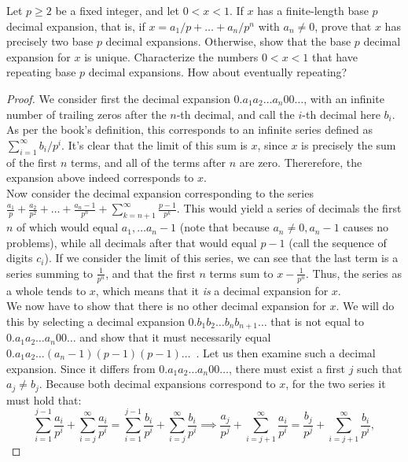 \begin{exercise}{21}
Let $p\geq 2$ be a fixed integer, and let $0<x<1$. If $x$ has a finite-length base $p$ decimal expansion, that is, if $x=a_1/p+\dots+a_n/p^n$ with $a_n\neq 0$, prove that $x$ has precisely two base $p$ decimal expansions. Otherwise, show that the base $p$ decimal expansion for $x$ is unique. Characterize the numbers $0<x<1$ that have repeating base $p$ decimal expansions. How about eventually repeating?
\end{exercise}
\begin{proof}
    We consider first the decimal expansion $0.a_1 a_2 \ldots a_n 0 0 \ldots$, with an infinite number of trailing zeros after the $n$-th decimal, and call the $i$-th decimal here $b_i$. As per the book's definition, this corresponds to an infinite series defined as $\sum_{i=1}^{\infty}b_i/p^i$. It's clear that the limit of this sum is $x$, since $x$ is precisely the sum of the first $n$ terms, and all of the terms after $n$ are zero. Thererefore, the expansion above indeed corresponds to $x$.\\

    Now consider the decimal expansion corresponding to the series $\frac{a_1}{p} + \frac{a_2}{p^2}+ \ldots + \frac{a_n - 1}{p^n} + \sum_{k=n+1}^{\infty}\frac{p-1}{p^k}$. This would yield a series of decimals the first $n$ of which would equal $a_1, \ldots a_n - 1$ (note that because $a_n \neq 0, a_n -1$ causes no problems), while all decimals after that would equal $p-1$ (call the sequence of digits $c_i$). If we consider the limit of this series, we can see that the last term is a series summing to $\frac{1}{p^n}$, and that the first $n$ terms sum to $x - \frac{1}{p^n}$. Thus, the series as a whole tends to $x$, which means that it \textit{is} a decimal expansion for $x$.\\

    We now have to show that there is no other decimal expansion for $x$. We will do this by selecting a decimal expansion $0.b_1 b_2 \ldots b_n b_{n+1} \ldots$ that is not equal to $0.a_1a_2 \ldots a_n 00\ldots$ and show that it must necessarily equal $0.a_1 a_2 \ldots (a_n-1) (p-1) (p-1)\ldots$\ . Let us then examine such a decimal expansion. Since it differs from $0.a_1 a_2 \ldots a_n 00\ldots$, there must exist a first $j$ such that $a_j \neq b_j$. Because both decimal expansions correspond to $x$, for the two series it must hold that:
    $$\sum_{i=1}^{j-1}\frac{a_i}{p^i} + \sum_{i=j}^{\infty}\frac{a_i}{p^i} = \sum_{i=1}^{j-1}\frac{b_i}{p^i} + \sum_{i=j}^{\infty}\frac{b_i}{p^i} \implies \frac{a_j}{p^j} + \sum_{i=j+1}^{\infty} \frac{a_i}{p^i} = \frac{b_j}{p^j} + \sum_{i=j+1}^{\infty}\frac{b_i}{p^i},$$


\end{proof}
